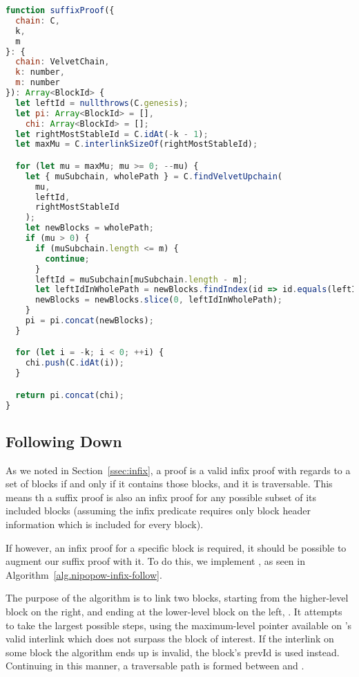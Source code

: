 \begin{lstlisting}[language=Javascript]
function suffixProof({
  chain: C,
  k,
  m
}: {
  chain: VelvetChain,
  k: number,
  m: number
}): Array<BlockId> {
  let leftId = nullthrows(C.genesis);
  let pi: Array<BlockId> = [],
    chi: Array<BlockId> = [];
  let rightMostStableId = C.idAt(-k - 1);
  let maxMu = C.interlinkSizeOf(rightMostStableId);

  for (let mu = maxMu; mu >= 0; --mu) {
    let { muSubchain, wholePath } = C.findVelvetUpchain(
      mu,
      leftId,
      rightMostStableId
    );
    let newBlocks = wholePath;
    if (mu > 0) {
      if (muSubchain.length <= m) {
        continue;
      }
      leftId = muSubchain[muSubchain.length - m];
      let leftIdInWholePath = newBlocks.findIndex(id => id.equals(leftId));
      newBlocks = newBlocks.slice(0, leftIdInWholePath);
    }
    pi = pi.concat(newBlocks);
  }

  for (let i = -k; i < 0; ++i) {
    chi.push(C.idAt(i));
  }

  return pi.concat(chi);
}
\end{lstlisting}

\subsection{Following Down}
As we noted in Section~\ref{ssec:infix}, a proof is a valid infix proof with regards to a set of blocks if and only if it contains those blocks, and it is traversable. This means th a suffix proof is also an infix proof for any possible subset of its included blocks (assuming the infix predicate requires only block header information which is included for every block).

If however, an infix proof for a specific block is required, it should be possible to augment our suffix proof with it. To do this, we implement , as seen in Algorithm~\ref{alg.nipopow-infix-follow}. 

The purpose of the algorithm is to link two blocks, starting from the higher-level block on the right,  and ending at the lower-level block on the left, . It attempts to take the largest possible steps, using the maximum-level pointer available on 's valid interlink which does not surpass the block of interest. If the interlink on some block the algorithm ends up is invalid, the block's \textsf{prevId} is used instead. Continuing in this manner, a traversable path is formed between  and .

